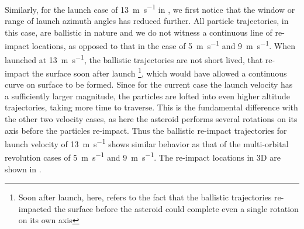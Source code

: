\FloatBarrier
Similarly, for the launch case of \SI{13}{\metre\per\second} in , we first notice that the window or range of launch azimuth angles has reduced further. All particle trajectories, in this case, are ballistic in nature and we do not witness a continuous line of re-impact locations, as opposed to that in the case of \SI{5}{\metre\per\second} and \SI{9}{\metre\per\second}. When launched at \SI{13}{\metre\per\second}, the ballistic trajectories are not short lived, that re-impact the surface soon after launch \footnote{Soon after launch, here, refers to the fact that the ballistic trajectories re-impacted the surface before the asteroid could complete even a single rotation on its own axis}, which would have allowed a continuous curve on surface to be formed. Since for the current case the launch velocity has a sufficiently larger magnitude, the particles are lofted into even higher altitude trajectories, taking more time to traverse. This is the fundamental difference with the other two velocity cases, as here the asteroid performs several rotations on its axis before the particles re-impact. Thus the ballistic re-impact trajectories for launch velocity of \SI{13}{\metre\per\second} shows similar behavior as that of the multi-orbital revolution cases of \SI{5}{\metre\per\second} and \SI{9}{\metre\per\second}. The re-impact locations in 3D are shown in .
